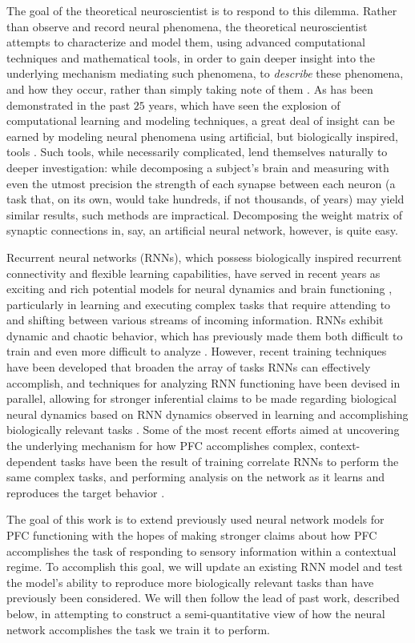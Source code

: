 \documentclass[12pt,a4paper,final]{iopart}
\begin{document}
The goal of the theoretical neuroscientist is to respond to this dilemma. Rather than observe and record neural phenomena, the theoretical neuroscientist attempts to characterize and model them, using advanced computational techniques and mathematical tools, in order to gain deeper insight into the underlying mechanism mediating such phenomena, to \emph{describe} these phenomena, and how they occur, rather than simply taking note of them \cite{Abbott2008}. As has been demonstrated in the past $25$ years, which have seen the explosion of computational learning and modeling techniques, a great deal of insight can be earned by modeling neural phenomena using artificial, but biologically inspired, tools \cite{Abbott2008}. Such tools, while necessarily complicated, lend themselves naturally to deeper investigation: while decomposing a subject's brain and measuring with even the utmost precision the strength of each synapse between each neuron (a task that, on its own, would take hundreds, if not thousands, of years) may yield similar results, such methods are impractical. Decomposing the weight matrix of synaptic connections in, say, an artificial neural network, however, is quite easy.

Recurrent neural networks (RNNs), which possess biologically inspired recurrent connectivity and flexible learning capabilities, have served in recent years as exciting and rich potential models for neural dynamics and brain functioning \cite{Mante2013,Miconi,Rajan,BarakSussillo,Williams}, particularly in learning and executing complex tasks that require attending to and shifting between various streams of incoming information. RNNs exhibit dynamic and chaotic behavior, which has previously made them both difficult to train and even more difficult to analyze \cite{Abarbanel, Sussillo}. However, recent training techniques have been developed that broaden the array of tasks RNNs can effectively accomplish, and techniques for analyzing RNN functioning have been devised in parallel, allowing for stronger inferential claims to be made regarding biological neural dynamics based on RNN dynamics observed in learning and accomplishing biologically relevant tasks \cite{Sussillo}. Some of the most recent efforts aimed at uncovering the underlying mechanism for how PFC accomplishes complex, context-dependent tasks have been the result of training correlate RNNs to perform the same complex tasks, and performing analysis on the network as it learns and reproduces the target behavior \cite{Mante2013}.

The goal of this work is to extend previously used neural network models for PFC functioning with the hopes of making stronger claims about how PFC accomplishes the task of responding to sensory information within a contextual regime. To accomplish this goal, we will update an existing RNN model and test the model's ability to reproduce more biologically relevant tasks than have previously been considered. We will then follow the lead of past work, described below, in attempting to construct a semi-quantitative view of how the neural network accomplishes the task we train it to perform.
\end{document}
